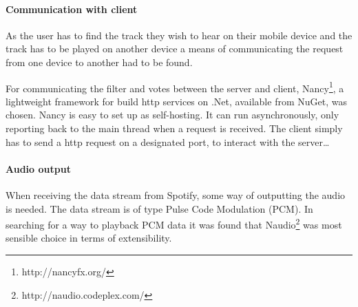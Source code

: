 \paragraph{Communication with client}
As the user has to find the track they wish to hear on their mobile device and the track has to be played on another device a means of communicating the request from one device to another had to be found.

For communicating the filter and votes between the server and client, Nancy\footnote{http://nancyfx.org/}, a lightweight framework for build http services on .Net, available from NuGet, was chosen. Nancy is easy to set up as self-hosting. It can run asynchronously, only reporting back to the main thread when a request is received. The client simply has to send a http request on a designated port, to interact with the server\dots {}

\paragraph{Audio output}
When receiving the data stream from Spotify, some way of outputting the audio is needed. The data stream is of type Pulse Code Modulation (PCM). In searching for a way to playback PCM data it was found that Naudio\footnote{http://naudio.codeplex.com/} was most sensible choice in terms of extensibility.

